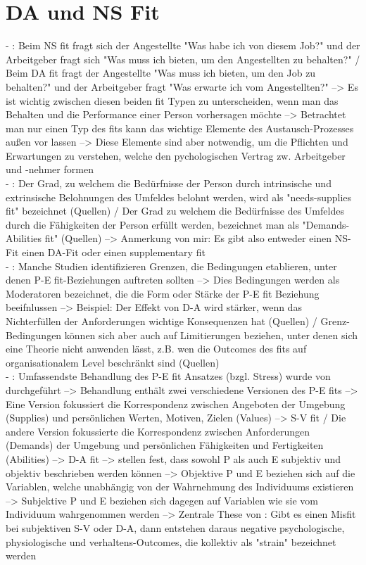 \section{DA und NS Fit}
\label{ch:personEnvironmentFit:DAundNS}
- \cite[S. 3]{caplan:1987}: Beim NS fit fragt sich der Angestellte "Was habe ich von diesem Job?" und der Arbeitgeber fragt sich "Was muss ich bieten, um den Angestellten zu behalten?" / Beim DA fit fragt der Angestellte "Was muss ich bieten, um den Job zu behalten?" und der Arbeitgeber fragt "Was erwarte ich vom Angestellten?" --> Es ist wichtig zwischen diesen beiden fit Typen zu unterscheiden, wenn man das Behalten und die Performance einer Person vorhersagen möchte --> Betrachtet man nur einen Typ des fits kann das wichtige Elemente des Austausch-Prozesses außen vor lassen --> Diese Elemente sind aber notwendig, um die Pflichten und Erwartungen zu verstehen, welche den pychologischen Vertrag zw. Arbeitgeber und -nehmer formen \\
- \cite[S. 4]{edwards:2008}: Der Grad, zu welchem die Bedürfnisse der Person durch intrinsische und extrinsische Belohnungen des Umfeldes belohnt werden, wird als "needs-supplies fit" bezeichnet (Quellen) / Der Grad zu welchem die Bedürfnisse des Umfeldes durch die Fähigkeiten der Person erfüllt werden, bezeichnet man als "Demands-Abilities fit" (Quellen) --> Anmerkung von mir: Es gibt also entweder einen NS-Fit einen DA-Fit oder einen supplementary fit \\
- \cite[S. 6]{edwards:2008}: Manche Studien identifizieren Grenzen, die Bedingungen etablieren, unter denen P-E fit-Beziehungen auftreten sollten --> Dies Bedingungen werden als Moderatoren bezeichnet, die die Form oder Stärke der P-E fit Beziehung beeifnlussen --> Beispiel: Der Effekt von D-A wird stärker, wenn das Nichterfüllen der Anforderungen wichtige Konsequenzen hat (Quellen) / Grenz-Bedingungen können sich aber auch auf Limitierungen beziehen, unter denen sich eine Theorie nicht anwenden lässt, z.B. wen die Outcomes des fits auf organisationalem Level beschränkt sind (Quellen) \\
- \cite[S. 2]{edwards:1990}: Umfassendste Behandlung des P-E fit Ansatzes (bzgl. Stress) wurde von \textcite{mechanismsOfJobStressAndStrain:1982} durchgeführt --> Behandlung enthält zwei verschiedene Versionen des P-E fits --> Eine Version fokussiert die Korrespondenz zwischen Angeboten der Umgebung (Supplies) und persönlichen Werten, Motiven, Zielen (Values) --> S-V fit / Die andere Version fokussierte die Korrespondenz zwischen Anforderungen (Demands) der Umgebung und persönlichen Fähigkeiten und Fertigkeiten (Abilities) --> D-A fit --> \textcite{mechanismsOfJobStressAndStrain:1982} stellen fest, dass sowohl P als auch E subjektiv und objektiv beschrieben werden können --> Objektive P und E beziehen sich auf die Variablen, welche unabhängig von der Wahrnehmung des Individuums existieren --> Subjektive P und E beziehen sich dagegen auf Variablen wie sie vom Individuum wahrgenommen werden --> Zentrale These von \textcite{mechanismsOfJobStressAndStrain:1982}: Gibt es einen Misfit bei subjektiven S-V oder D-A, dann entstehen daraus negative psychologische, physiologische und verhaltens-Outcomes, die kollektiv als "strain" bezeichnet werden \\
